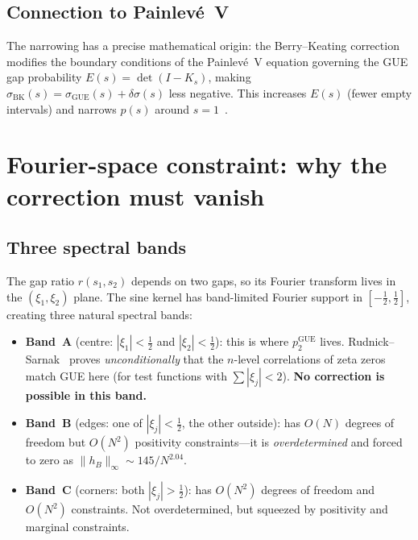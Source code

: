 \documentclass[10pt]{article}
\begin{document}
\subsection{Connection to Painlev\'e~V}

The narrowing has a precise mathematical origin: the Berry--Keating
correction modifies the boundary conditions of the Painlev\'e~V equation
governing the GUE gap probability $E(s) = \det(I - K_s)$, making
$\sigma_{\mathrm{BK}}(s) = \sigma_{\mathrm{GUE}}(s) + \delta\sigma(s)$
less negative. This increases $E(s)$ (fewer empty intervals) and narrows
$p(s)$ around $s = 1$~\cite{alarcon2026a}.


\section{Fourier-space constraint: why the correction must vanish}
\label{sec:fourier}

\subsection{Three spectral bands}

The gap ratio $r(s_1, s_2)$ depends on two gaps, so its Fourier transform
lives in the $(\xi_1, \xi_2)$ plane. The sine kernel has band-limited
Fourier support in $[-\tfrac{1}{2}, \tfrac{1}{2}]$, creating three natural
spectral bands:
\begin{itemize}
\item \textbf{Band~A} (centre: $|\xi_1| < \tfrac{1}{2}$ and $|\xi_2| < \tfrac{1}{2}$):
this is where $p_2^{\mathrm{GUE}}$ lives.
Rudnick--Sarnak~\cite{rudnick1996} proves \emph{unconditionally} that the
$n$-level correlations of zeta zeros match GUE here (for test functions
with $\sum|\xi_j| < 2$). \textbf{No correction is possible in this band.}

\item \textbf{Band~B} (edges: one of $|\xi_j| < \tfrac{1}{2}$, the other outside):
has $O(N)$ degrees of freedom but $O(N^2)$ positivity constraints---it is
\emph{overdetermined} and forced to zero as $\|h_B\|_\infty \sim 145/N^{2.04}$.

\item \textbf{Band~C} (corners: both $|\xi_j| > \tfrac{1}{2}$):
has $O(N^2)$ degrees of freedom and $O(N^2)$ constraints.
Not overdetermined, but squeezed by positivity and marginal constraints.
\end{itemize}
\end{document}
